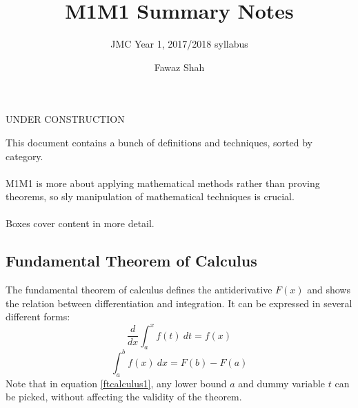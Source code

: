 \documentclass{scrartcl}
\title{M1M1 Summary Notes}
\subtitle{JMC Year 1, 2017/2018 syllabus}
\date{}
\author{Fawaz Shah}
\begin{document}
\large
\maketitle
\begin{center}
UNDER CONSTRUCTION
\end{center}
\noindent This document contains a bunch of definitions and techniques, sorted by category.
\\\\
M1M1 is more about applying mathematical methods rather than proving theorems, so sly manipulation of mathematical techniques is crucial.
\\\\
Boxes cover content in more detail.
\tableofcontents
\newpage

\subsection{Fundamental Theorem of Calculus}
The fundamental theorem of calculus defines the antiderivative $ F(x) $ and shows the relation between differentiation and integration. It can be expressed in several different forms:
\begin{equation} \label{ftcalculus1}
\frac{d}{dx} \int_{a}^{x} f(t) \ dt = f(x)
\end{equation}
\begin{equation}
\int_{a}^{b} f(x) \ dx = F(b) - F(a)
\end{equation}
Note that in equation \ref{ftcalculus1}, any lower bound $ a $ and dummy variable $ t $ can be picked, without affecting the validity of the theorem.
\end{document}
